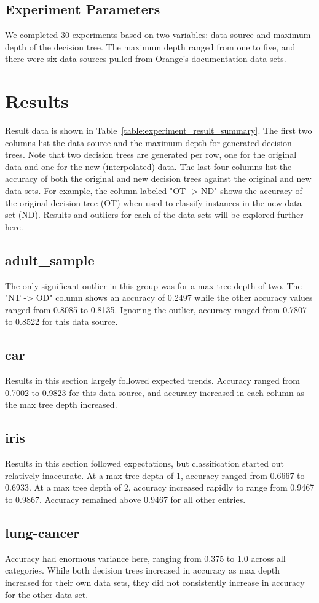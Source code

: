\documentclass{sig-alternate}
\begin{document}
\subsection{Experiment Parameters}
We completed 30 experiments based on two variables: data source and maximum depth of the decision tree. The maximum depth ranged from one to five, and there were six data sources pulled from Orange's documentation data sets.

\section{Results}
Result data is shown in Table~\ref{table:experiment_result_summary}. The first two columns list the data source and the maximum depth for generated decision trees. Note that two decision trees are generated per row, one for the original data and one for the new (interpolated) data. The last four columns list the accuracy of both the original and new decision trees against the original and new data sets. For example, the column labeled "OT -> ND" shows the accuracy of the original decision tree (OT) when used to classify instances in the new data set (ND). Results and outliers for each of the data sets will be explored further here.
\subsection{adult\_sample}
The only significant outlier in this group was for a max tree depth of two. The "NT -> OD" column shows an accuracy of 0.2497 while the other accuracy values ranged from 0.8085 to 0.8135. Ignoring the outlier, accuracy ranged from 0.7807 to 0.8522 for this data source.
\subsection{car}
Results in this section largely followed expected trends. Accuracy ranged from 0.7002 to 0.9823 for this data source, and accuracy increased in each column as the max tree depth increased.
\subsection{iris}
Results in this section followed expectations, but classification started out relatively inaccurate. At a max tree depth of 1, accuracy ranged from 0.6667 to 0.6933. At a max tree depth of 2, accuracy increased rapidly to range from 0.9467 to 0.9867. Accuracy remained above 0.9467 for all other entries.
\subsection{lung-cancer}
Accuracy had enormous variance here, ranging from 0.375 to 1.0 across all categories. While both decision trees increased in accuracy as max depth increased for their own data sets, they did not consistently increase in accuracy for the other data set.
\end{document}
